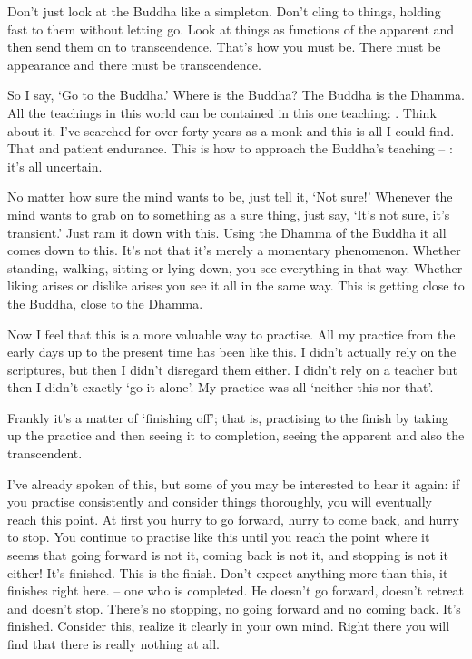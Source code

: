 Don't just look at the Buddha like a simpleton. Don't cling to things, holding fast to them without letting go. Look at things as functions of the apparent and then send them on to transcendence. That's how you must be. There must be appearance and there must be transcendence.

So I say, `Go to the Buddha.' Where is the Buddha? The Buddha is the Dhamma. All the teachings in this world can be contained in this one teaching: . Think about it. I've searched for over forty years as a monk and this is all I could find. That and patient endurance. This is how to approach the Buddha's teaching -- : it's all uncertain.

No matter how sure the mind wants to be, just tell it, `Not sure!' Whenever the mind wants to grab on to something as a sure thing, just say, `It's not sure, it's transient.' Just ram it down with this. Using the Dhamma of the Buddha it all comes down to this.  It's not that it's merely a momentary phenomenon. Whether standing, walking, sitting or lying down, you see everything in that way. Whether liking arises or dislike arises you see it all in the same way. This is getting close to the Buddha, close to the Dhamma.

Now I feel that this is a more valuable way to practise. All my practice from the early days up to the present time has been like this. I didn't actually rely on the scriptures, but then I didn't disregard them either. I didn't rely on a teacher but then I didn't exactly `go it alone'. My practice was all `neither this nor that'.

Frankly it's a matter of `finishing off'; that is, practising to the finish by taking up the practice and then seeing it to completion, seeing the apparent and also the transcendent.

I've already spoken of this, but some of you may be interested to hear it again: if you practise consistently and consider things thoroughly, you will eventually reach this point. At first you hurry to go forward, hurry to come back, and hurry to stop. You continue to practise like this until you reach the point where it seems that going forward is not it, coming back is not it, and stopping is not it either! It's finished. This is the finish. Don't expect anything more than this, it finishes right here.  -- one who is completed. He doesn't go forward, doesn't retreat and doesn't stop. There's no stopping, no going forward and no coming back. It's finished. Consider this, realize it clearly in your own mind. Right there you will find that there is really nothing at all.

